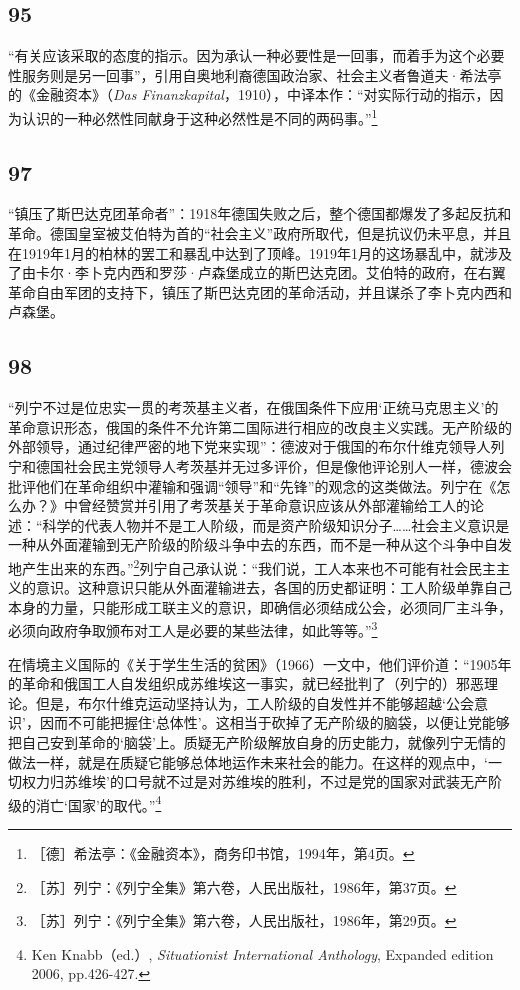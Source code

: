 \documentclass[fontset=fandol, a4paper, 12pt, openright]{ctexbook}
\begin{document}
\subsection*{95}
“有关应该采取的态度的指示。因为承认一种必要性是一回事，而着手为这个必要性服务则是另一回事”，引用自奥地利裔德国政治家、社会主义者鲁道夫·希法亭的《金融资本》（\textit{Das Finanzkapital}，1910），中译本作：“对实际行动的指示，因为认识的一种必然性同献身于这种必然性是不同的两码事。”\footnote{［德］希法亭：《金融资本》，商务印书馆，1994年，第4页。}

\subsection*{97}
“镇压了斯巴达克团革命者”：1918年德国失败之后，整个德国都爆发了多起反抗和革命。德国皇室被艾伯特为首的“社会主义”政府所取代，但是抗议仍未平息，并且在1919年1月的柏林的罢工和暴乱中达到了顶峰。1919年1月的这场暴乱中，就涉及了由卡尔·李卜克内西和罗莎·卢森堡成立的斯巴达克团。艾伯特的政府，在右翼革命自由军团的支持下，镇压了斯巴达克团的革命活动，并且谋杀了李卜克内西和卢森堡。

\subsection*{98}
“列宁不过是位忠实一贯的考茨基主义者，在俄国条件下应用‘正统马克思主义’的革命意识形态，俄国的条件不允许第二国际进行相应的改良主义实践。无产阶级的外部领导，通过纪律严密的地下党来实现”：德波对于俄国的布尔什维克领导人列宁和德国社会民主党领导人考茨基并无过多评价，但是像他评论别人一样，德波会批评他们在革命组织中灌输和强调“领导”和“先锋”的观念的这类做法。列宁在《怎么办？》中曾经赞赏并引用了考茨基关于革命意识应该从外部灌输给工人的论述：“科学的代表人物并不是工人阶级，而是资产阶级知识分子……社会主义意识是一种从外面灌输到无产阶级的阶级斗争中去的东西，而不是一种从这个斗争中自发地产生出来的东西。”\footnote{［苏］列宁：《列宁全集》第六卷，人民出版社，1986年，第37页。}列宁自己承认说：“我们说，工人本来也不可能有社会民主主义的意识。这种意识只能从外面灌输进去，各国的历史都证明：工人阶级单靠自己本身的力量，只能形成工联主义的意识，即确信必须结成公会，必须同厂主斗争，必须向政府争取颁布对工人是必要的某些法律，如此等等。”\footnote{［苏］列宁：《列宁全集》第六卷，人民出版社，1986年，第29页。}

在情境主义国际的《关于学生生活的贫困》（1966）一文中，他们评价道：“1905年的革命和俄国工人自发组织成苏维埃这一事实，就已经批判了（列宁的）邪恶理论。但是，布尔什维克运动坚持认为，工人阶级的自发性并不能够超越‘公会意识’，因而不可能把握住‘总体性’。这相当于砍掉了无产阶级的脑袋，以便让党能够把自己安到革命的‘脑袋’上。质疑无产阶级解放自身的历史能力，就像列宁无情的做法一样，就是在质疑它能够总体地运作未来社会的能力。在这样的观点中，‘一切权力归苏维埃’的口号就不过是对苏维埃的胜利，不过是党的国家对武装无产阶级的消亡‘国家’的取代。”\footnote{Ken Knabb（ed.）, \textit{Situationist International Anthology}, Expanded edition 2006, pp.426-427.}
\end{document}
